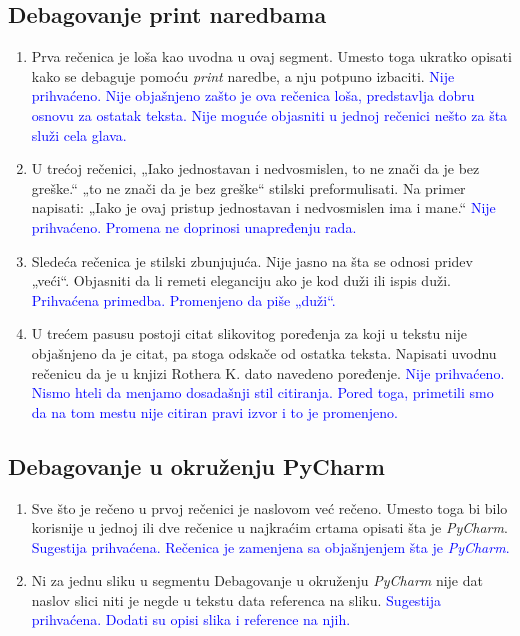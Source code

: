 \documentclass[a4paper]{report}
\newcommand{\odgovor}[1]{\textcolor{blue}{#1}}
\begin{document}
\subsection{Debagovanje print naredbama}
\begin{enumerate}
    \item Prva rečenica je loša kao uvodna u ovaj segment. Umesto toga ukratko opisati kako se debaguje pomoću \emph{print} naredbe, a nju potpuno izbaciti.
    \odgovor{Nije prihvaćeno. Nije objašnjeno zašto je ova rečenica loša, predstavlja dobru osnovu za ostatak teksta. Nije moguće objasniti u jednoj rečenici nešto za šta služi cela glava.}
    \item U trećoj rečenici, „Iako jednostavan i nedvosmislen, to ne znači da je bez greške.“ „to ne znači da je bez greške“ stilski preformulisati. Na primer napisati:
    „Iako je ovaj pristup jednostavan i nedvosmislen ima i mane.“
    \odgovor{Nije prihvaćeno. Promena ne doprinosi unapređenju rada.}
    \item Sledeća rečenica je stilski zbunjujuća. Nije jasno na šta se odnosi pridev „veći“. Objasniti da li remeti eleganciju ako je kod duži ili ispis duži.
    \odgovor{Prihvaćena primedba. Promenjeno da piše „duži“.}
    \item U trećem pasusu postoji citat slikovitog poređenja za koji u tekstu nije objašnjeno da je citat, pa stoga odskače od ostatka teksta. Napisati uvodnu rečenicu da je u knjizi Rothera K. dato navedeno poređenje.
    \odgovor{Nije prihvaćeno. Nismo hteli da menjamo dosadašnji stil citiranja. Pored toga, primetili smo da na tom mestu nije citiran pravi izvor i to je promenjeno.}
\end{enumerate}
\subsection{Debagovanje u okruženju PyCharm}
\begin{enumerate}
    \item Sve što je rečeno u prvoj rečenici je naslovom već rečeno. Umesto toga bi bilo korisnije u jednoj ili dve rečenice u najkraćim crtama opisati šta je \emph{PyCharm}.
    \odgovor{Sugestija prihvaćena. Rečenica je zamenjena sa objašnjenjem šta je \emph{PyCharm}.}
    \item Ni za jednu sliku u segmentu Debagovanje u okruženju \emph{PyCharm} nije dat naslov slici niti je negde u tekstu data referenca na sliku.
    \odgovor{Sugestija prihvaćena. Dodati su opisi slika i reference na njih.}
\end{enumerate}
\end{document}
